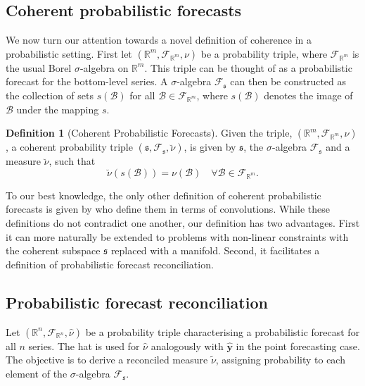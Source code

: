 \documentclass[a4paper,12pt]{article}
\theoremstyle{definition}
\newtheorem{definition}{Definition}[section]
\begin{document}
\subsection{Coherent probabilistic forecasts}

We now turn our attention towards a novel definition of coherence in a probabilistic setting. First let $(\mathbb{R}^m, \mathscr{F}_{\mathbb{R}^m}, \nu)$ be a probability triple, where $\mathscr{F}_{\mathbb{R}^m}$ is the usual Borel $\sigma$-algebra on $\mathbb{R}^m$. This triple can be thought of as a probabilistic forecast for the bottom-level series. A $\sigma$-algebra $\mathscr{F}_{\mathfrak{s}}$ can then be constructed as the collection of sets $s(\mathcal{B})$ for all $\mathcal{B}\in \mathscr{F}_{\mathbb{R}^m}$, where $s(\mathcal{B})$ denotes the image of $\mathcal{B}$ under the mapping $s$.

\begin{definition}[Coherent Probabilistic Forecasts]\label{def:cohprob}
	Given the triple, $(\mathbb{R}^m, \mathscr{F}_{\mathbb{R}^m}, \nu)$, a coherent probability triple $(\mathfrak{s}, \mathscr{F}_{\mathfrak{s}}, \breve{\nu})$, is given by $\mathfrak{s}$, the $\sigma$-algebra $\mathscr{F}_{\mathfrak{s}}$ and a measure $\breve{\nu}$, such that
	\[
	\breve{\nu}(s(\mathcal{B})) = \nu(\mathcal{B}) \quad \forall \mathcal{B} \in \mathscr{F}_{\mathbb{R}^m}.
	\]
\end{definition}

To our best knowledge, the only other definition of coherent probabilistic forecasts is given by \cite{Taieb2017} who define them in terms of convolutions. While these definitions do not contradict one another, our definition has two advantages. First it can more naturally be extended to problems with non-linear constraints with the coherent subspace $\mathfrak{s}$ replaced with a manifold. Second, it facilitates a definition of probabilistic forecast reconciliation.

\subsection{Probabilistic forecast reconciliation}

Let $(\mathbb{R}^n, \mathscr{F}_{\mathbb{R}^n}, \hat{\nu})$ be a probability triple characterising a probabilistic forecast for all $n$ series. The hat is used for $\hat{\nu}$ analogously with $\hat{\bm{y}}$ in the point forecasting case. The objective is to derive a reconciled measure $\tilde{\nu}$, assigning probability to each element of the $\sigma$-algebra $\mathscr{F}_\mathfrak{s}$.
\end{document}

